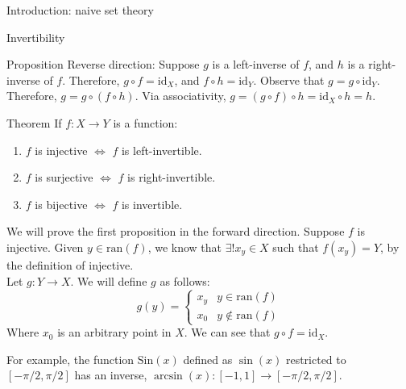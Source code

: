 \documentclass[10pt]{extarticle}
\begin{document}
\begin{problem}{Introduction: naive set theory}
\begin{problem}{Invertibility}
\begin{problem}{Proposition}
          Reverse direction: Suppose $g$ is a left-inverse of $f$, and $h$ is a right-inverse of $f$. Therefore, $g\circ f = \textrm{id}_X$, and $f\circ h = \textrm{id}_Y$. Observe that $g = g\circ \textrm{id}_Y$. Therefore, $g = g\circ(f\circ h)$. Via associativity, $g = (g\circ f)\circ h = \textrm{id}_X \circ h = h$.
      \end{problem}
      \begin{problem}{Theorem}
        If $f:X\rightarrow Y$ is a function:
        \begin{enumerate}
          \item $f$ is injective $\Leftrightarrow$ $f$ is left-invertible.
          \item $f$ is surjective $\Leftrightarrow$ $f$ is right-invertible.
          \item $f$ is bijective $\Leftrightarrow$ $f$ is invertible.
        \end{enumerate}
        \tcblower
        We will prove the first proposition in the forward direction. Suppose $f$ is injective. Given $y\in \textrm{ran}(f)$, we know that $\exists! x_y\in X$ such that $f(x_y) = Y$, by the definition of injective.\\

        Let $g:Y\rightarrow X$. We will define $g$ as follows:
        \[
          g(y) = \begin{cases}
            x_y & y\in \textrm{ran}(f) \\
            x_0 & y\notin \textrm{ran}(f)
          \end{cases}
        \] 
        Where $x_0$ is an arbitrary point in $X$. We can see that $g\circ f = \textrm{id}_X$.
      \end{problem}
      For example, the function $\textrm{Sin}(x)$ defined as $\sin(x)$ restricted to $[-\pi/2,\pi/2]$ has an inverse, $\arcsin(x):[-1,1] \rightarrow [-\pi/2,\pi/2]$.
    \end{problem}
  \end{problem}
\end{document}
